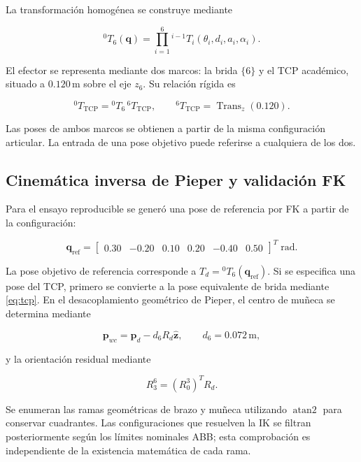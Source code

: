 \documentclass[conference]{IEEEtran}
\begin{document}
La transformación homogénea se construye mediante

\begin{equation}
{}^{0}\!T_6(\bm q)=
\prod_{i=1}^{6}
{}^{i-1}\!T_i(\theta_i,d_i,a_i,\alpha_i).
\label{eq:fk}
\end{equation}

El efector se representa mediante dos marcos: la brida $\{6\}$ y el TCP académico, situado a $0.120$\,m sobre el eje $z_6$. Su relación rígida es

\begin{equation}
{}^{0}\!T_{\mathrm{TCP}}
={}^0\!T_6\,{}^6\!T_{\mathrm{TCP}},
\qquad
{}^6\!T_{\mathrm{TCP}}
=\operatorname{Trans}_z(0.120).
\label{eq:tcp}
\end{equation}

Las poses de ambos marcos se obtienen a partir de la misma configuración articular. La entrada de una pose objetivo puede referirse a cualquiera de los dos.

\subsection{Cinemática inversa de Pieper y validación FK}

Para el ensayo reproducible se generó una pose de referencia por FK a partir de la configuración:

\begin{equation}
\bm q_{\mathrm{ref}}=
\begin{bmatrix}
0.30&-0.20&0.10&0.20&-0.40&0.50
\end{bmatrix}^{T}
\;\mathrm{rad}.
\label{eq:qref}
\end{equation}

La pose objetivo de referencia corresponde a $T_d={}^{0}\!T_6(\bm q_{\mathrm{ref}})$. Si se especifica una pose del TCP, primero se convierte a la pose equivalente de brida mediante \eqref{eq:tcp}. En el desacoplamiento geométrico de Pieper, el centro de muñeca se determina mediante

\begin{equation}
\bm p_{wc}
=\bm p_d-d_6R_d\hat{\bm z},
\qquad d_6=0.072\,\mathrm m,
\label{eq:wc}
\end{equation}

y la orientación residual mediante

\begin{equation}
R_3^6=(R_0^3)^T R_d.
\label{eq:residual}
\end{equation}

Se enumeran las ramas geométricas de brazo y muñeca utilizando $\operatorname{atan2}$ para conservar cuadrantes. Las configuraciones que resuelven la IK se filtran posteriormente según los límites nominales ABB; esta comprobación es independiente de la existencia matemática de cada rama.
\end{document}
